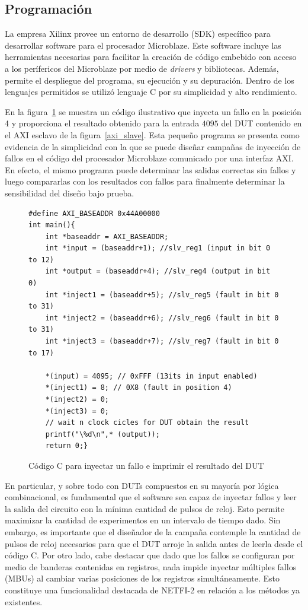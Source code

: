 \documentclass[a4paper,openright,12pt]{report}
\begin{document}
\subsection{Programación}

La empresa Xilinx provee un entorno de desarrollo (SDK) específico para desarrollar software para el procesador Microblaze. Este software incluye las herramientas necesarias para facilitar la creación de código embebido con acceso a los perífericos del Microblaze por medio de \textit{drivers} y bibliotecas. Además, permite el despliegue del programa, su ejecución y su depuración. Dentro de los lenguajes permitidos se utilizó lenguaje C por su simplicidad y alto rendimiento. 

En la figura~\ref{c_example} se muestra un código ilustrativo que inyecta un fallo en la posición 4 y proporciona el resultado obtenido para la entrada $4095$ del DUT contenido en el AXI esclavo de la figura~\ref{axi_slave}. Esta pequeño programa se presenta como evidencia de la simplicidad con la que se puede diseñar campañas de inyección de fallos en el código del procesador Microblaze comunicado por una interfaz AXI. En efecto, el mismo programa puede determinar las salidas correctas sin fallos y luego compararlas con los resultados con fallos para finalmente determinar la sensibilidad del diseño bajo prueba.


\begin{figure}[H]
\centering
\begin{lstlisting}
#define AXI_BASEADDR 0x44A00000
int main(){
	int *baseaddr = AXI_BASEADDR;
	int *input = (baseaddr+1); //slv_reg1 (input in bit 0 to 12)
	int *output = (baseaddr+4); //slv_reg4 (output in bit 0)
	int *inject1 = (baseaddr+5); //slv_reg5 (fault in bit 0 to 31)
	int *inject2 = (baseaddr+6); //slv_reg6 (fault in bit 0 to 31)
	int *inject3 = (baseaddr+7); //slv_reg7 (fault in bit 0 to 17)
		
	*(input) = 4095; // 0xFFF (13its in input enabled)
	*(inject1) = 8; // 0X8 (fault in position 4) 
	*(inject2) = 0;
	*(inject3) = 0;
	// wait n clock cicles for DUT obtain the result
	printf("\%d\n",* (output));	
	return 0;}
\end{lstlisting}
	\caption{Código C para inyectar un fallo e imprimir el resultado del DUT}
	\label{c_example}
\end{figure}

En particular, y sobre todo con DUTs compuestos en su mayoría por lógica combinacional, es fundamental que el software sea capaz de inyectar fallos y leer la salida del circuito con la mínima cantidad de pulsos de reloj. Esto permite maximizar la cantidad de experimentos en un intervalo de tiempo dado. Sin embargo, es importante que el diseñador de la campaña contemple la cantidad de pulsos de reloj necesarios para que el DUT arroje la salida antes de leerla desde el código C. Por otro lado, cabe destacar que dado que los fallos se configuran por medio de banderas contenidas en registros, nada impide inyectar múltiples fallos (MBUs) al cambiar varias posiciones de los registros simultáneamente. Esto constituye una funcionalidad destacada de NETFI-2 en relación a los métodos ya existentes.
\end{document}
